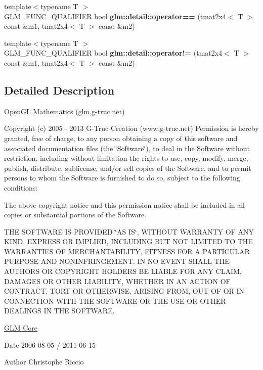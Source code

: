 \begin{DoxyCompactItemize}
\item 
\hypertarget{namespaceglm_1_1detail_ac198d1c5283e3e7c2076c4b6a9f235b1}{}{\footnotesize template$<$typename T $>$ }\\G\+L\+M\+\_\+\+F\+U\+N\+C\+\_\+\+Q\+U\+A\+L\+I\+F\+I\+E\+R bool {\bfseries glm\+::detail\+::operator==} (tmat2x4$<$ T $>$ const \&m1, tmat2x4$<$ T $>$ const \&m2)\label{namespaceglm_1_1detail_ac198d1c5283e3e7c2076c4b6a9f235b1}

\item 
\hypertarget{namespaceglm_1_1detail_a09a22ccea6a744560cb579b24da8f30a}{}{\footnotesize template$<$typename T $>$ }\\G\+L\+M\+\_\+\+F\+U\+N\+C\+\_\+\+Q\+U\+A\+L\+I\+F\+I\+E\+R bool {\bfseries glm\+::detail\+::operator!=} (tmat2x4$<$ T $>$ const \&m1, tmat2x4$<$ T $>$ const \&m2)\label{namespaceglm_1_1detail_a09a22ccea6a744560cb579b24da8f30a}

\end{DoxyCompactItemize}


\subsection{Detailed Description}
Open\+G\+L Mathematics (glm.\+g-\/truc.\+net)

Copyright (c) 2005 -\/ 2013 G-\/\+Truc Creation (www.\+g-\/truc.\+net) Permission is hereby granted, free of charge, to any person obtaining a copy of this software and associated documentation files (the \char`\"{}\+Software\char`\"{}), to deal in the Software without restriction, including without limitation the rights to use, copy, modify, merge, publish, distribute, sublicense, and/or sell copies of the Software, and to permit persons to whom the Software is furnished to do so, subject to the following conditions\+:

The above copyright notice and this permission notice shall be included in all copies or substantial portions of the Software.

T\+H\+E S\+O\+F\+T\+W\+A\+R\+E I\+S P\+R\+O\+V\+I\+D\+E\+D \char`\"{}\+A\+S I\+S\char`\"{}, W\+I\+T\+H\+O\+U\+T W\+A\+R\+R\+A\+N\+T\+Y O\+F A\+N\+Y K\+I\+N\+D, E\+X\+P\+R\+E\+S\+S O\+R I\+M\+P\+L\+I\+E\+D, I\+N\+C\+L\+U\+D\+I\+N\+G B\+U\+T N\+O\+T L\+I\+M\+I\+T\+E\+D T\+O T\+H\+E W\+A\+R\+R\+A\+N\+T\+I\+E\+S O\+F M\+E\+R\+C\+H\+A\+N\+T\+A\+B\+I\+L\+I\+T\+Y, F\+I\+T\+N\+E\+S\+S F\+O\+R A P\+A\+R\+T\+I\+C\+U\+L\+A\+R P\+U\+R\+P\+O\+S\+E A\+N\+D N\+O\+N\+I\+N\+F\+R\+I\+N\+G\+E\+M\+E\+N\+T. I\+N N\+O E\+V\+E\+N\+T S\+H\+A\+L\+L T\+H\+E A\+U\+T\+H\+O\+R\+S O\+R C\+O\+P\+Y\+R\+I\+G\+H\+T H\+O\+L\+D\+E\+R\+S B\+E L\+I\+A\+B\+L\+E F\+O\+R A\+N\+Y C\+L\+A\+I\+M, D\+A\+M\+A\+G\+E\+S O\+R O\+T\+H\+E\+R L\+I\+A\+B\+I\+L\+I\+T\+Y, W\+H\+E\+T\+H\+E\+R I\+N A\+N A\+C\+T\+I\+O\+N O\+F C\+O\+N\+T\+R\+A\+C\+T, T\+O\+R\+T O\+R O\+T\+H\+E\+R\+W\+I\+S\+E, A\+R\+I\+S\+I\+N\+G F\+R\+O\+M, O\+U\+T O\+F O\+R I\+N C\+O\+N\+N\+E\+C\+T\+I\+O\+N W\+I\+T\+H T\+H\+E S\+O\+F\+T\+W\+A\+R\+E O\+R T\+H\+E U\+S\+E O\+R O\+T\+H\+E\+R D\+E\+A\+L\+I\+N\+G\+S I\+N T\+H\+E S\+O\+F\+T\+W\+A\+R\+E.

\hyperlink{group__core}{G\+L\+M Core}

\begin{DoxyDate}{Date}
2006-\/08-\/05 / 2011-\/06-\/15 
\end{DoxyDate}
\begin{DoxyAuthor}{Author}
Christophe Riccio 
\end{DoxyAuthor}
